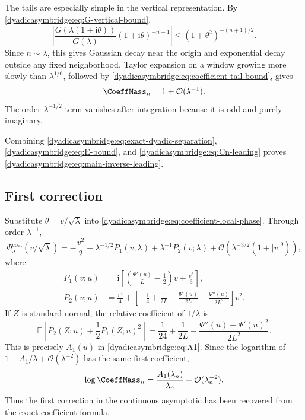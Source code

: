 \documentclass[11pt,oneside]{article}
\theoremstyle{definition}
\theoremstyle{remark}
\newcommand{\ii}{\mathrm i}
\newcommand{\E}{\mathbb E}
\newcommand{\bigO}{\mathcal O}
\begin{document}
The tails are especially simple in the vertical representation.  By
\eqref{dyadicasymbridge:eq:G-vertical-bound},
\begin{equation}
 \left|
 \frac{G(\lambda(1+\ii\theta))}{G(\lambda)}
 (1+\ii\theta)^{-n-1}
 \right|
 \le(1+\theta^2)^{-(n+1)/2}.
\label{dyadicasymbridge:eq:coefficient-tail-bound}
\end{equation}
Since $n\sim\lambda$, this gives Gaussian decay near the origin and exponential decay outside any fixed neighborhood.  Taylor expansion on a window growing more slowly than $\lambda^{1/6}$, followed by \eqref{dyadicasymbridge:eq:coefficient-tail-bound}, gives
\begin{equation}
 \CoeffMass_n=1+\bigO(\lambda^{-1}).
\label{dyadicasymbridge:eq:Cn-leading}
\end{equation}
The order $\lambda^{-1/2}$ term vanishes after integration because it is odd and purely imaginary.

Combining \eqref{dyadicasymbridge:eq:exact-dyadic-separation}, \eqref{dyadicasymbridge:eq:E-bound}, and
\eqref{dyadicasymbridge:eq:Cn-leading} proves \eqref{dyadicasymbridge:eq:main-inverse-leading}.

\subsection{First correction}

Substitute $\theta=v/\sqrt\lambda$ into \eqref{dyadicasymbridge:eq:coefficient-local-phase}.  Through order
$\lambda^{-1}$,
\begin{equation}
 \Phi^{\mathrm{coef}}_\lambda(v/\sqrt\lambda)
 =-\frac{v^2}{2}+\lambda^{-1/2}P_1(v;\lambda)
 +\lambda^{-1}P_2(v;\lambda)
 +\bigO\!\left(\lambda^{-3/2}(1+|v|^9)\right),
\label{dyadicasymbridge:eq:phase-first-expansion}
\end{equation}
where
\begin{align}
 P_1(v;u)
 &=\ii\left[
 \left(\frac{\Psi'(u)}L-\frac12\right)v+\frac{v^3}{3}
 \right],                                                   \label{dyadicasymbridge:eq:P1}\\
 P_2(v;u)
 &=\frac{v^4}{4}+
 \left[-\frac14+\frac1{2L}+\frac{\Psi'(u)}{2L}
 -\frac{\Psi''(u)}{2L^2}\right]v^2.                       \label{dyadicasymbridge:eq:P2}
\end{align}
If $Z$ is standard normal, the relative coefficient of $1/\lambda$ is
\begin{equation}
 \E\left[P_2(Z;u)+\frac12P_1(Z;u)^2\right]
 =\frac1{24}+\frac1{2L}
 -\frac{\Psi''(u)+\Psi'(u)^2}{2L^2}.
\label{dyadicasymbridge:eq:first-Gaussian-contraction}
\end{equation}
This is precisely $A_1(u)$ in \eqref{dyadicasymbridge:eq:A1}.  Since the logarithm of
$1+A_1/\lambda+\bigO(\lambda^{-2})$ has the same first coefficient,
\begin{equation}
 \log\CoeffMass_n=
 \frac{A_1(\lambda_n)}{\lambda_n}+\bigO(\lambda_n^{-2}).
\label{dyadicasymbridge:eq:Cn-first}
\end{equation}
Thus the first correction in the continuous asymptotic has been recovered from the exact coefficient formula.
\end{document}
